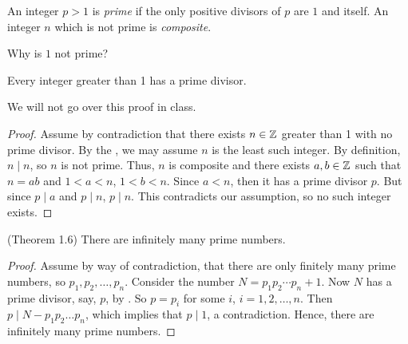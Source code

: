 \documentclass{ximera}
\begin{document}
\begin{defn}
An integer $p>1$ is \emph{prime} if the only positive divisors of $p$ are $1$ and itself. An integer $n$ which is not prime is \emph{composite}. 
\end{defn}

Why is $1$ not prime?


\begin{lemma}[Lemma 1.5]\label{lem:prime-composite}
 Every integer greater than 1 has a prime divisor.
\end{lemma}

We will not go over this proof in class.

\begin{proof} 
 Assume by contradiction that there exists $n\in\mathbb Z$ greater than 1 with no prime divisor. By the , we may assume $n$ is the least such integer. By definition, $n\mid n$, so $n$ is not prime. Thus, $n$ is composite and there exists $a,b\in\mathbb Z$ such that $n=ab$ and $1<a<n$, $1<b<n$. Since $a<n$, then it has a prime divisor $p$. But since $p\mid a$ and $p\mid n$, $p\mid n$. This contradicts our assumption, so no such integer exists.
\end{proof}


\begin{thm*}\label{thm:inf-primes}(Theorem 1.6)
 There are infinitely many prime numbers.
\end{thm*}
\begin{proof}
 Assume by way of contradiction, that there are only finitely many prime numbers, so $p_1,p_2,\dots,p_n$. Consider the number $N=p_1p_2\cdots p_n +1$. Now $N$ has a prime divisor, say, $p$, by . So $p=p_i$ for some $i$, $i=1,2,\dots,n$. Then $p\mid N-p_1p_2\dots p_n$, which implies that $p\mid 1$, a contradiction. Hence, there are infinitely many prime numbers.
\end{proof}
\end{document}
